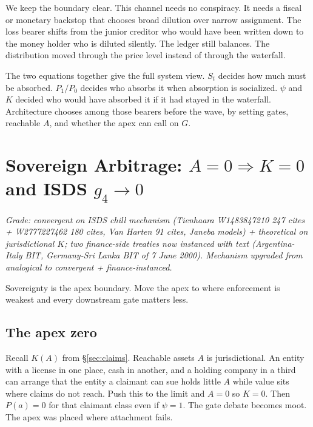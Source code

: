 \documentclass[11pt]{article}
\begin{document}
We keep the boundary clear. This channel needs no conspiracy. It needs a fiscal or monetary backstop that chooses broad dilution over narrow assignment. The loss bearer shifts from the junior creditor who would have been written down to the money holder who is diluted silently. The ledger still balances. The distribution moved through the price level instead of through the waterfall.

The two equations together give the full system view. $S_t$ decides how much must be absorbed. $P_1/P_0$ decides who absorbs it when absorption is socialized. $\psi$ and $K$ decided who would have absorbed it if it had stayed in the waterfall. Architecture chooses among those bearers before the wave, by setting gates, reachable $A$, and whether the apex can call on $G$.

\section{Sovereign Arbitrage: \texorpdfstring{$A=0\Rightarrow K=0$}{A=0 implies K=0} and ISDS \texorpdfstring{$g_4\to0$}{g4->0}}
\label{sec:sovereign}

\textit{Grade: convergent on ISDS chill mechanism (Tienhaara W1483847210 247 cites + W2777227462 180 cites, Van Harten 91 cites, Janeba models) + theoretical on jurisdictional $K$; two finance-side treaties now instanced with text (Argentina-Italy BIT, Germany-Sri Lanka BIT of 7 June 2000). Mechanism upgraded from analogical to convergent + finance-instanced.}

Sovereignty is the apex boundary. Move the apex to where enforcement is weakest and every downstream gate matters less.

\subsection{The apex zero}

Recall $K(A)$ from \S\ref{sec:claims}. Reachable assets $A$ is jurisdictional. An entity with a license in one place, cash in another, and a holding company in a third can arrange that the entity a claimant can sue holds little $A$ while value sits where claims do not reach. Push this to the limit and $A=0$ so $K=0$. Then $P(a)=0$ for that claimant class even if $\psi=1$. The gate debate becomes moot. The apex was placed where attachment fails.
\end{document}
